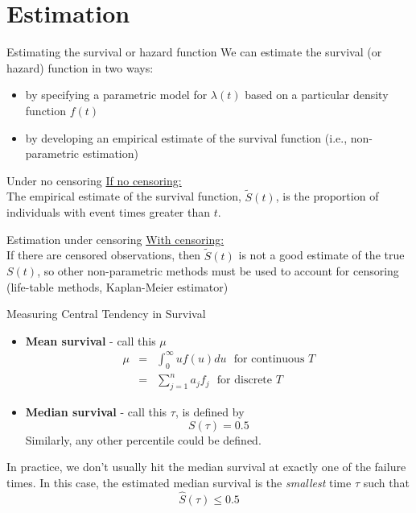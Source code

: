 \documentclass[envcountsect, 10pt, portrait, palatino]{beamer}
\begin{document}
\section{Estimation}
\begin{frame}{Estimating the survival or hazard function}
We can estimate the survival (or hazard) function in two
ways:
\begin{itemize}
\item by specifying a parametric model for $\lambda(t)$
based on a particular density function $f(t)$
\item by developing an empirical estimate of the survival
function (i.e., non-parametric estimation)
\end{itemize}
\end{frame}
\begin{frame}{Under no censoring}
\underline{If no censoring:}\\[2ex]
The empirical estimate of the survival function, $\tilde{S}(t)$,
is the proportion of individuals with event times greater than $t$.
\end{frame}
\begin{frame}{Estimation under censoring}
\underline{With censoring:}\\[2ex]
If there are censored observations, then $\tilde{S}(t)$ is not a
good estimate of the true $S(t)$, so other non-parametric methods
must be used to account for censoring (life-table methods,
Kaplan-Meier estimator)
\end{frame}
\begin{frame}{Measuring Central Tendency in Survival}
\begin{itemize}
\item  {\bf Mean survival} - call this $\mu$
\begin{eqnarray*}
 \mu & = & \int_{0}^{\infty} u f(u)du ~~~\mbox{for continuous } T\\
 & = & \sum_{j=1}^n a_j f_j ~~~\mbox{for discrete } T
\end{eqnarray*}
\item  {\bf Median survival} - call this $\tau$, is defined by
\[  S(\tau) = 0.5 \]
Similarly, any other percentile could be defined.
\end{itemize}
In practice, we don't usually hit the median survival at exactly
one of the failure times.  In this case, the estimated median survival
is the {\em smallest} time $\tau$ such that
$$\hat{S}(\tau)\leq 0.5$$
\end{frame}
\end{document}
